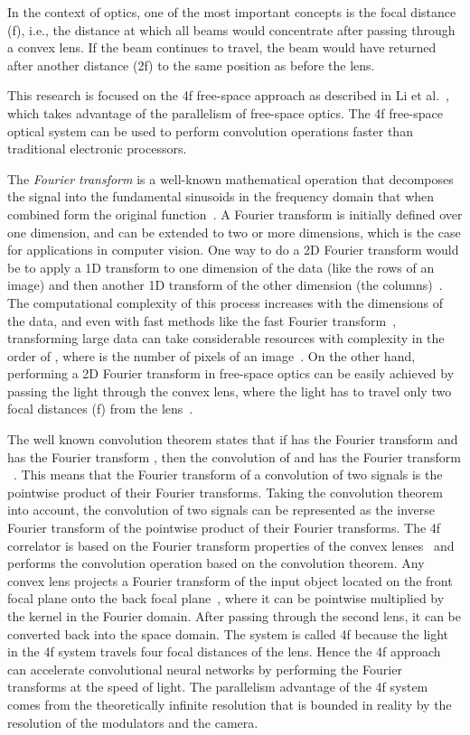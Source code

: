 \documentclass{article}
\begin{document}
In the context of optics, one of the most important concepts is the focal distance (f), i.e., the distance at which all beams would concentrate after passing through a convex lens. If the beam continues to travel, the beam would have returned after another distance (2f) to the same position as before the lens. 

This research is focused on the 4f free-space approach as described in Li et al.~\cite{li_channel_2020}, which takes advantage of the parallelism of free-space optics. The 4f free-space optical system can be used to perform convolution operations faster than traditional electronic processors.

The \textit{Fourier transform} is a well-known mathematical operation that decomposes the signal into the fundamental sinusoids in the frequency domain that when combined form the original function~\cite{bracewell_fourier_2000}. A Fourier transform is initially defined over one dimension, and can be extended to two or more dimensions, which is the case for applications in computer vision. One way to do a 2D Fourier transform would be to apply a 1D transform to one dimension of the data (like the rows of an image) and then another 1D transform of the other dimension (the columns)~\cite{gaskill_linear_1978, bracewell_fourier_2000}. The computational complexity of this process increases with the dimensions of the data, and even with fast methods like the fast Fourier transform~\cite{cooley_algorithm_1965}, transforming large data can take considerable resources with complexity in the order of , where  is the number of pixels of an image~\cite{colburn_optical_2019}. On the other hand, performing a 2D Fourier transform in free-space optics can be easily achieved by passing the light through the convex lens, where the light has to travel only two focal distances (f) from the lens~\cite{jutamulia_fourier_2002}. 

The well known convolution theorem states that if  has the Fourier transform  and  has the Fourier transform , then the convolution of  and  has the Fourier transform ~\cite{bracewell_fourier_2000}. This means that the Fourier transform of a convolution of two signals is the pointwise product of their Fourier transforms. Taking the convolution theorem into account, the convolution of two signals can be represented as the inverse Fourier transform of the pointwise product of their Fourier transforms. The 4f correlator is based on the Fourier transform properties of the convex lenses~\cite{culshaw_fourier_2020} and performs the convolution operation based on the convolution theorem. Any convex lens projects a Fourier transform of the input object located on the front focal plane onto the back focal plane~\cite{culshaw_fourier_2020}, where it can be pointwise multiplied by the kernel in the Fourier domain. After passing through the second lens, it can be converted back into the space domain. The system is called 4f because the light in the 4f system travels four focal distances of the lens. Hence the 4f approach can accelerate convolutional neural networks by performing the Fourier transforms at the speed of light. The parallelism advantage of the 4f system comes from the theoretically infinite resolution that is bounded in reality by the resolution of the modulators and the camera. 
\end{document}
